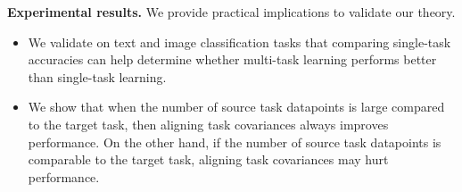 

\textbf{Experimental results.} We provide practical implications to validate our theory.
\begin{itemize}
	\item We validate on text and image classification tasks that comparing single-task accuracies can help determine whether multi-task learning performs better than single-task learning.
	\item We show that when the number of source task datapoints is large compared to the target task, then aligning task covariances always improves performance.
	On the other hand, if the number of source task datapoints is comparable to the target task, aligning task covariances may hurt performance.
\end{itemize}


